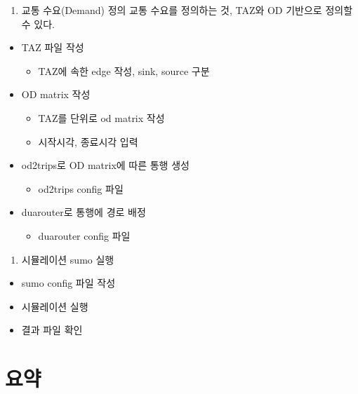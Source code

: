 \documentclass[
  letterpaper,
  DIV=11,
  numbers=noendperiod]{scrreprt}
\providecommand{\tightlist}{%
  \setlength{\itemsep}{0pt}\setlength{\parskip}{0pt}}
\begin{document}
\begin{enumerate}
\def\labelenumi{\arabic{enumi}.}
\setcounter{enumi}{1}
\tightlist
\item
  교통 수요(Demand) 정의 교통 수요를 정의하는 것, TAZ와 OD 기반으로
  정의할 수 있다.
\end{enumerate}

\begin{itemize}
\tightlist
\item
  TAZ 파일 작성

  \begin{itemize}
  \tightlist
  \item
    TAZ에 속한 edge 작성, sink, source 구분
  \end{itemize}
\item
  OD matrix 작성

  \begin{itemize}
  \tightlist
  \item
    TAZ를 단위로 od matrix 작성
  \item
    시작시각, 종료시각 입력
  \end{itemize}
\item
  od2trips로 OD matrix에 따른 통행 생성

  \begin{itemize}
  \tightlist
  \item
    od2trips config 파일\\
  \end{itemize}
\item
  duarouter로 통행에 경로 배정

  \begin{itemize}
  \tightlist
  \item
    duarouter config 파일
  \end{itemize}
\end{itemize}

\begin{enumerate}
\def\labelenumi{\arabic{enumi}.}
\setcounter{enumi}{2}
\tightlist
\item
  시뮬레이션 sumo 실행
\end{enumerate}

\begin{itemize}
\tightlist
\item
  sumo config 파일 작성
\item
  시뮬레이션 실행
\item
  결과 파일 확인
\end{itemize}

\section{요약}\label{uxc694uxc57d-1}
\end{document}
